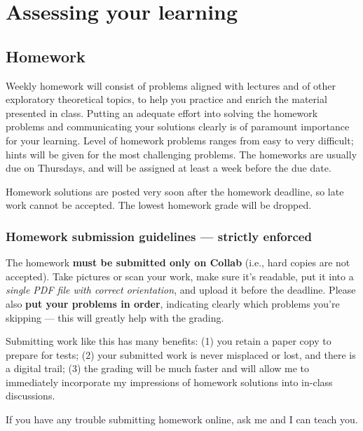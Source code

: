 \documentclass[oneside,11pt]{amsart}
\begin{document}
\section{Assessing your learning}

\subsection{Homework}

Weekly homework will consist of
problems aligned with lectures
and of other exploratory theoretical topics,
to help you practice and enrich the material presented in class.
Putting an adequate effort into solving the homework
problems and
communicating your solutions clearly is
of paramount importance for your learning.
Level of homework problems ranges from easy to very difficult;
hints will be given for the most challenging problems.
The homeworks are usually due on
Thursdays, and will be assigned at least a week before the due
date.

Homework solutions are posted very soon after the
homework deadline, so late work cannot be accepted.
The lowest homework grade will be dropped.

\subsubsection*{Homework submission guidelines --- strictly enforced}
The homework \textbf{must be submitted only on Collab} (i.e., hard copies are not accepted).
Take pictures or scan your work,
make sure it's readable,
put it into a \emph{single PDF file with correct orientation},
and upload it before the deadline.
Please also \textbf{put your problems in order}, indicating clearly which problems you're skipping --- this will greatly help with the grading.

Submitting work like this has many benefits:
(1) you retain a paper copy to
prepare for tests;
(2) your submitted work is never misplaced or lost, and there is a digital trail;
(3) the grading will be much faster and will allow me to immediately
incorporate my impressions of homework solutions into in-class
discussions.

If you have any trouble submitting homework online, ask me and I can teach you.
\end{document}
